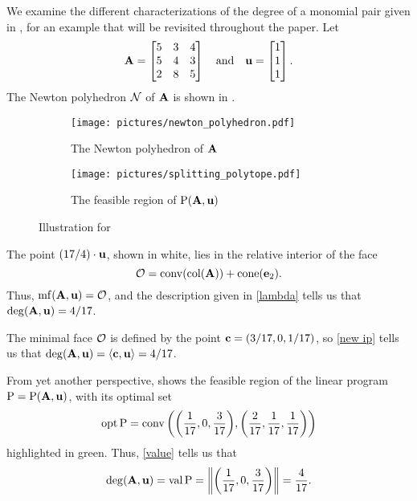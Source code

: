 \documentclass{amsart}
\begin{document}
\begin{example}
   \label{ex: ft}
   We examine the different characterizations of the degree of a monomial pair given in , for an example that will be revisited throughout the paper.
   Let
   \[\mathbf{A}=\begin{bmatrix}5&3&4\\ 5&4&3\\ 2&8&5\end{bmatrix} \quad \text{and} \quad \mathbf{u} =
      \begin{bmatrix} 1 \\ 1\\ 1 \end{bmatrix}.\]
   The Newton polyhedron $\mathcal{N}$ of $\mathbf{A}$ is shown in .
   \begin{figure}
   \centering
   \begin{subfigure}{.48\textwidth}
      \centering
      \texttt{[image: pictures/newton\_polyhedron.pdf]}\\[1.4mm]
      \caption{The Newton polyhedron of $\mathbf{A}$}
      \label{fig: newton polyhedron}
   \end{subfigure}
   \begin{subfigure}{.48\textwidth}
      \centering
      \texttt{[image: pictures/splitting\_polytope.pdf]}
      \caption{The feasible region of $\mathrm{P}(\mathbf{A},\mathbf{u})$}
      \label{fig: splitting polytope}
   \end{subfigure}
      \caption{Illustration for }
   \label{fig: newton polyhedron and splitting polytope}
   \end{figure}
   The point $(17/4)\cdot \mathbf{u}$, shown in white, lies in the relative interior of the face
   \[\mathcal{O} = \operatorname{conv}(\operatorname{col}(\mathbf{A})) + \operatorname{cone}(\mathbf{e}_2).\]
   Thus, $\operatorname{mf}(\mathbf{A},\mathbf{u}) = \mathcal{O}$, and the description given in \ref{lambda} tells us that $\operatorname{deg}(\mathbf{A},\mathbf{u}) = 4/17$.

   The minimal face $\mathcal{O}$ is defined by the point $\mathbf{c} = (3/17, 0, 1/17)$, so \ref{new ip} tells us that
   $\operatorname{deg}(\mathbf{A},\mathbf{u}) = \langle \mathbf{c}, \mathbf{u} \rangle = 4/17$.

   From yet another perspective,  shows the feasible region of the linear program $\mathrm{P} = \mathrm{P}(\mathbf{A},\mathbf{u})$, with its optimal set
   \[\operatorname{opt} \mathrm{P} = \operatorname{conv}\bigg(\bigg(\frac1{17}, 0, \frac3{17}\bigg),\bigg(\frac2{17}, \frac1{17}, \frac1{17}\bigg)\bigg)\]
   highlighted in green.
   Thus, \ref{value} tells us that
   \[\operatorname{deg}(\mathbf{A},\mathbf{u}) = \operatorname{val} \mathrm{P} = \bigg\|\bigg(\frac1{17}, 0, \frac3{17}\bigg)\bigg\| = \frac4{17}.\]
\end{example}
\end{document}
